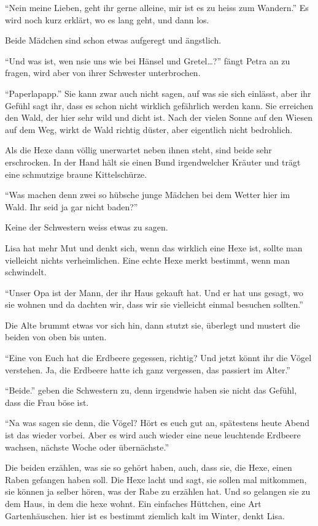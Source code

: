\enquote{Nein meine Lieben, geht ihr gerne alleine, mir ist es zu heiss zum Wandern.} Es wird noch kurz erklärt, wo es lang geht, und dann los.

Beide Mädchen sind schon etwas aufgeregt und ängstlich.

\enquote{Und was ist, wen nsie uns wie bei Hänsel und Gretel\dots?} fängt Petra an zu fragen, wird aber von ihrer Schwester unterbrochen.

\enquote{Paperlapapp.} Sie kann zwar auch nicht sagen, auf was sie sich einlässt, aber ihr Gefühl sagt ihr, dass es schon nicht wirklich gefährlich werden kann. Sie erreichen den Wald, der hier sehr wild und dicht ist. Nach der vielen Sonne auf den Wiesen auf dem Weg, wirkt de Wald richtig düster, aber eigentlich nicht bedrohlich.

Als die Hexe dann völlig unerwartet neben ihnen steht, sind beide sehr erschrocken. In der Hand hält sie einen Bund irgendwelcher Kräuter und trägt eine schmutzige braune Kittelschürze.

\enquote{Was machen denn zwei so hübsche junge Mädchen bei dem Wetter hier im Wald. Ihr seid ja gar nicht baden?}

Keine der Schwestern weiss etwas zu sagen.

Lisa hat mehr Mut und denkt sich, wenn das wirklich eine Hexe ist, sollte man vielleicht nichts verheimlichen. Eine echte Hexe merkt bestimmt, wenn man schwindelt.

\enquote{Unser Opa ist der Mann, der ihr Haus gekauft hat. Und er hat uns gesagt, wo sie wohnen und da dachten wir, dass wir sie vielleicht einmal besuchen sollten.}

Die Alte brummt etwas vor sich hin, dann stutzt sie, überlegt und mustert die beiden von oben bis unten.

\enquote{Eine von Euch hat die Erdbeere gegessen, richtig? Und jetzt könnt ihr die Vögel verstehen. Ja, die Erdbeere hatte ich ganz vergessen, das passiert im Alter.}

\enquote{Beide.} geben die Schwestern zu, denn irgendwie haben sie nicht das Gefühl, dass die Frau böse ist. 

\enquote{Na was sagen sie denn, die Vögel? Hört es euch gut an, spätestens heute Abend ist das wieder vorbei. Aber es wird auch wieder eine neue leuchtende Erdbeere wachsen, nächste Woche oder übernächste.} 

Die beiden erzählen, was sie so gehört haben, auch, dass sie, die Hexe, einen Raben gefangen haben soll. Die Hexe lacht und sagt, sie sollen mal mitkommen, sie können ja selber hören, was der Rabe zu erzählen hat. Und so gelangen sie zu dem Haus, in dem die hexe wohnt. Ein einfaches Hüttchen, eine Art Gartenhäuschen. hier ist es bestimmt ziemlich kalt im Winter, denkt Lisa. 

